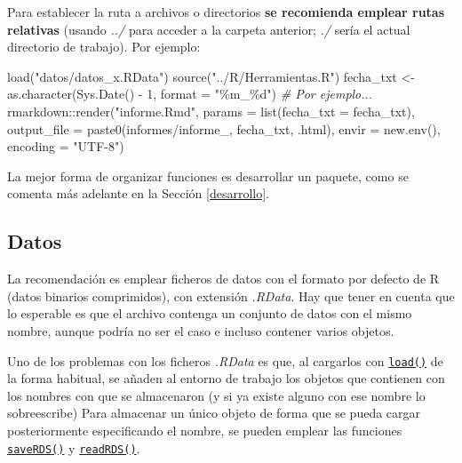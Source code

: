\documentclass[
]{book}
\newenvironment{Shaded}{\begin{snugshade}}{\end{snugshade}}
\newcommand{\AttributeTok}[1]{\textcolor[rgb]{0.77,0.63,0.00}{#1}}
\newcommand{\CommentTok}[1]{\textcolor[rgb]{0.56,0.35,0.01}{\textit{#1}}}
\newcommand{\DecValTok}[1]{\textcolor[rgb]{0.00,0.00,0.81}{#1}}
\newcommand{\FunctionTok}[1]{\textcolor[rgb]{0.00,0.00,0.00}{#1}}
\newcommand{\NormalTok}[1]{#1}
\newcommand{\OtherTok}[1]{\textcolor[rgb]{0.56,0.35,0.01}{#1}}
\newcommand{\SpecialCharTok}[1]{\textcolor[rgb]{0.00,0.00,0.00}{#1}}
\newcommand{\StringTok}[1]{\textcolor[rgb]{0.31,0.60,0.02}{#1}}
\theoremstyle{break}
\theoremstyle{nonumberplain}
\begin{document}
Para establecer la ruta a archivos o directorios \textbf{se recomienda emplear rutas relativas} (usando \emph{../} para acceder a la carpeta anterior; \emph{./} sería el actual directorio de trabajo).
Por ejemplo:

\begin{Shaded}
\begin{Highlighting}[]
\FunctionTok{load}\NormalTok{(}\StringTok{"datos/datos\_x.RData"}\NormalTok{)}
\FunctionTok{source}\NormalTok{(}\StringTok{"../R/Herramientas.R"}\NormalTok{)}
\NormalTok{fecha\_txt }\OtherTok{\textless{}{-}} \FunctionTok{as.character}\NormalTok{(}\FunctionTok{Sys.Date}\NormalTok{() }\SpecialCharTok{{-}} \DecValTok{1}\NormalTok{, }\AttributeTok{format =} \StringTok{"\%m\_\%d"}\NormalTok{) }\CommentTok{\# Por ejemplo...}
\NormalTok{rmarkdown}\SpecialCharTok{::}\FunctionTok{render}\NormalTok{(}\StringTok{"informe.Rmd"}\NormalTok{, }\AttributeTok{params =} \FunctionTok{list}\NormalTok{(}\AttributeTok{fecha\_txt =}\NormalTok{ fecha\_txt),}
                  \AttributeTok{output\_file =} \FunctionTok{paste0}\NormalTok{(}\StringTok{\textquotesingle{}informes/informe\_\textquotesingle{}}\NormalTok{, fecha\_txt, }\StringTok{\textquotesingle{}.html\textquotesingle{}}\NormalTok{), }
                  \AttributeTok{envir =} \FunctionTok{new.env}\NormalTok{(), }\AttributeTok{encoding =} \StringTok{"UTF{-}8"}\NormalTok{)}
\end{Highlighting}
\end{Shaded}

La mejor forma de organizar funciones es desarrollar un paquete, como se comenta más adelante en la Sección \ref{desarrollo}.

\hypertarget{datos}{%
\subsection{Datos}\label{datos}}

La recomendación es emplear ficheros de datos con el formato por defecto de R (datos binarios comprimidos), con extensión \emph{.RData}.
Hay que tener en cuenta que lo esperable es que el archivo contenga un conjunto de datos con el mismo nombre, aunque podría no ser el caso e incluso contener varios objetos.

Uno de los problemas con los ficheros \emph{.RData} es que, al cargarlos con \href{https://rdrr.io/r/base/load.html}{\texttt{load()}} de la forma habitual, se añaden al entorno de trabajo los objetos que contienen con los nombres con que se almacenaron (y si ya existe alguno con ese nombre lo sobreescribe)
Para almacenar un único objeto de forma que se pueda cargar posteriormente especificando el nombre, se pueden emplear las funciones \href{https://rdrr.io/r/base/readRDS.html}{\texttt{saveRDS()}} y \href{https://rdrr.io/r/base/readRDS.html}{\texttt{readRDS()}}.
\end{document}
